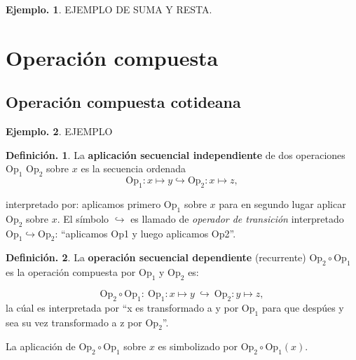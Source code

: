 \documentclass[]{book}
\theoremstyle{definition}
\newtheorem{definition}{Definición.}[chapter]
\theoremstyle{definition}
\newtheorem{example}{Ejemplo.}[chapter]
\theoremstyle{definition}
\theoremstyle{remark}
\begin{document}
\begin{example}
\protect\hypertarget{exm:unnamed-chunk-6}{}{\label{exm:unnamed-chunk-6} }
EJEMPLO DE SUMA Y RESTA.
\end{example}

\hypertarget{operaciuxf3n-compuesta}{%
\section*{Operación compuesta}\label{operaciuxf3n-compuesta}}

\hypertarget{operaciuxf3n-compuesta-cotideana}{%
\subsection*{Operación compuesta cotideana}\label{operaciuxf3n-compuesta-cotideana}}

\begin{example}
\protect\hypertarget{exm:unnamed-chunk-7}{}{\label{exm:unnamed-chunk-7} }EJEMPLO
\end{example}

\begin{definition}
\protect\hypertarget{def:unnamed-chunk-8}{}{\label{def:unnamed-chunk-8} }
La \textbf{aplicación secuencial independiente} de dos operaciones
\(\mbox{Op}_1\) \(\mbox{Op}_2\) sobre \(x\) es la secuencia ordenada
\[  \mbox{Op}_1: x \mapsto y \hookrightarrow  \mbox{Op}_2: x \mapsto z , \]

interpretado por: aplicamos primero \(\mbox{Op}_1\) sobre \(x\) para
en segundo lugar aplicar \(\mbox{Op}_2\) sobre \(x\). El símbolo
\(\hookrightarrow\) es llamado de \emph{operador de transición}
interpretado \(\mbox{Op}_1 \hookrightarrow \mbox{Op}_2\): ``aplicamos Op1 y luego aplicamos Op2''.
\end{definition}

\begin{definition}
\protect\hypertarget{def:unnamed-chunk-9}{}{\label{def:unnamed-chunk-9} }
La \textbf{operación secuencial dependiente} (recurrente) \(\mbox{Op}_2 \circ \mbox{Op}_1\) es la operación compuesta por \(\mbox{Op}_1\)
y \(\mbox{Op}_2\) es:

\[ \mbox{Op}_2 \circ \mbox{Op}_1: \ \mbox{Op}_1: x \mapsto y
  \ \hookrightarrow \ \mbox{Op}_2: y \mapsto  z, \]
la cúal es interpretada por ``x es transformado a y por
\(\mbox{Op}_1\) para que despúes y sea su vez transformado a z
por \(\mbox{Op}_2\)''.

La aplicación de \(\mbox{Op}_2 \circ \mbox{Op}_1\) sobre \(x\) es
simbolizado por \(\mbox{Op}_2 \circ \mbox{Op}_1(x)\).
\end{definition}
\end{document}
